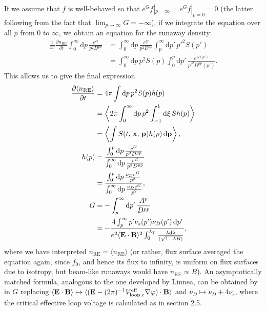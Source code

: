 \documentclass[11pt,a4paper]{article}
\newcommand{\rd}{\ensuremath{\mathrm{d}}}
\newcommand{\sub}[1]{\ensuremath{_{\text{#1}}}}
\renewcommand{\b}[1]{\ensuremath{ {\bf #1 } }}
\begin{document}
If we assume that $f$ is well-behaved so that $e^G f|_{p=\infty} = e^G f|_{p=0} = 0$ (the latter following from the fact that $\lim_{p\to\infty} G = -\infty$), if we integrate the equation over all $p$ from 0 to $\infty$, we obtain an equation for the runaway density:
\begin{align}
\frac{1}{4\pi} \frac{\partial n\sub{RE}}{\partial t} \int_0^\infty \rd p \,\frac{e^G}{p^2 D^{pp}} &= \int_0^\infty \rd p \, \frac{e^G}{p^2 D^{pp}} \int_p^\infty \rd p' \, p'^2S(p') \nonumber \\
&=\int_0^\infty \rd p \, p^2S(p) \int_0^p \rd p' \, \frac{e^{G(p')}}{p'^2 D^{pp}(p')}.
\end{align}
This allows us to give the final expression
\begin{align}
\frac{\partial \langle n\sub{RE}\rangle}{\partial t} &= 4\pi \int \rd p \,p^2S(p)h(p) \nonumber \\
&= \left\langle 2\pi\int_0^\infty \rd p \,p^2\int_{-1}^1 \rd \xi \,S h(p) \right\rangle \nonumber \\
&= \left\langle  \int S(t,\,\b{x},\,\b{p}) h(p) \, \rd\b{p}\right\rangle,  \nonumber \\
h(p) &=  \frac{ \int_0^p \rd p \,\frac{e^G}{p^2 D^{pp}}}{ \int_0^\infty \rd p \,\frac{e^G}{p^2 D^{pp}}} \nonumber \\
&= \frac{ \int_0^p \rd p \,\frac{\nu_D e^G}{p^2}}{ \int_0^\infty \rd p \,\frac{\nu_D e^G}{p^2}}, \nonumber \\
G &= -\int_p^\infty \rd p' \,\frac{A^p}{D^{pp}} \nonumber \\
&= - \frac{4 \int_p^\infty p'\nu_s(p')\nu_D(p') \,\rd p'}{e^2 \langle \b{E}\cdot\b{B}\rangle^2 \int_0^{\lambda_T} \frac{\lambda\rd\lambda}{\langle\sqrt{1-\lambda B}\rangle}},
\end{align}
where we have interpreted $n\sub{RE} = \langle n\sub{RE}\rangle$ (or rather, flux surface averaged the equation again, since $f_0$, and hence its flux to infinity, is uniform on flux surfaces due to isotropy, but beam-like runaways would have $n\sub{RE}\propto B$). An asymptotically matched formula, analogous to the one developed by Linnea, can be obtained by in $G$ replacing $\langle \b{E}\cdot\b{B}\rangle \mapsto \langle (\b{E}-(2\pi)^{-1}V\sub{loop,c}^\text{eff}\nabla\varphi)\cdot\b{B}\rangle$ and $\nu_D\mapsto \nu_D+4\nu_s$, where the critical effective loop voltage is calculated as in section 2.5.
\end{document}
